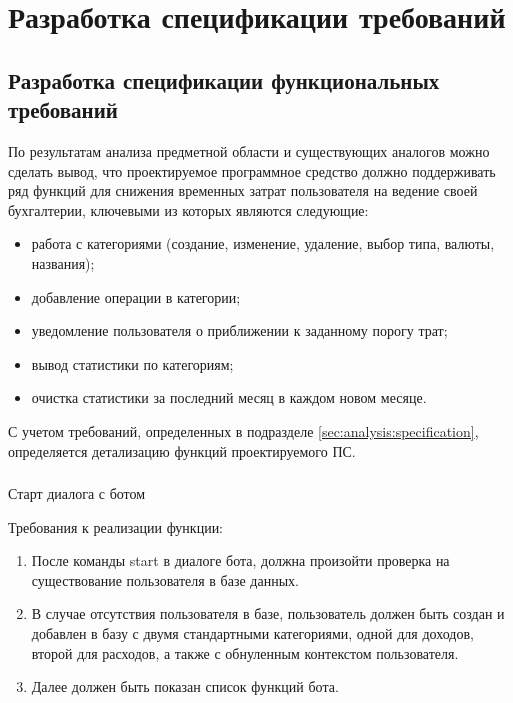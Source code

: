 \section{Разработка спецификации требований}
\label{sec:domain}

\subsection{Разработка спецификации функциональных требований}
\label{sec:domain:specification}

По результатам анализа предметной области и существующих аналогов можно сделать вывод, что проектируемое программное средство должно поддерживать ряд функций для снижения временных затрат пользователя на ведение своей бухгалтерии, ключевыми из которых являются следующие:

\begin{itemize}
	\item работа с категориями (создание, изменение, удаление, выбор типа, валюты, названия);
	\item добавление операции в категории;
	\item уведомление пользователя о приближении к заданному порогу трат;
	\item вывод статистики по категориям;
	\item очистка статистики за последний месяц в каждом новом месяце.
\end{itemize}

С учетом требований, определенных в подразделе \ref{sec:analysis:specification}, определяется детализацию функций проектируемого ПС.

\subsubsection{} Старт диалога с ботом
\label{sec:domain:specification:startdialog}

Требования к реализации функции:

\begin{enumerate}
	\item После команды start в диалоге бота, должна произойти проверка на существование пользователя в базе данных.
	\item В случае отсутствия пользователя в базе, пользователь должен быть создан и добавлен в базу с двумя стандартными категориями, одной для доходов, второй для расходов, а также с обнуленным контекстом пользователя.
	\item Далее должен быть показан список функций бота.
\end{enumerate}

